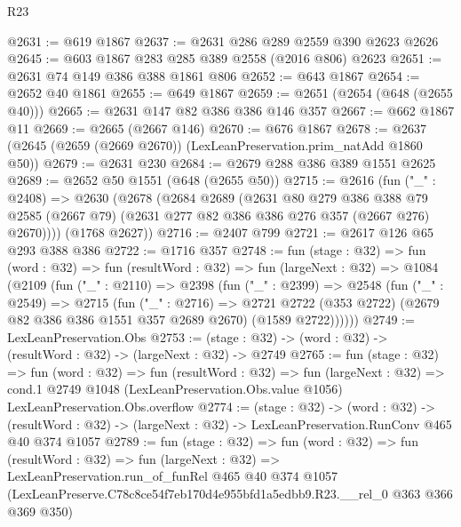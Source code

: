 \begin{lexlean}{R23}
\begin{coremodule}
@2631 := @619 @1867
@2637 := @2631 @286 @289 @2559 @390 @2623 @2626
@2645 := @603 @1867 @283 @285 @389 @2558 (@2016 @806) @2623
@2651 := @2631 @74 @149 @386 @388 @1861 @806
@2652 := @643 @1867
@2654 := @2652 @40 @1861
@2655 := @649 @1867
@2659 := @2651 (@2654 (@648 (@2655 @40)))
@2665 := @2631 @147 @82 @386 @386 @146 @357
@2667 := @662 @1867 @11
@2669 := @2665 (@2667 @146)
@2670 := @676 @1867
@2678 := @2637 (@2645 (@2659 (@2669 @2670)) (LexLeanPreservation.prim_natAdd @1860 @50))
@2679 := @2631 @230
@2684 := @2679 @288 @386 @389 @1551 @2625
@2689 := @2652 @50 @1551 (@648 (@2655 @50))
@2715 := @2616
    (fun ("_" : @2408) =>
    @2630
      (@2678
        (@2684
          @2689
          (@2631
            @80
            @279
            @386
            @388
            @79
            @2585
            (@2667 @79)
            (@2631 @277 @82 @386 @386 @276 @357 (@2667 @276) @2670))))
      (@1768 @2627))
@2716 := @2407 @799
@2721 := @2617 @126 @65 @293 @388 @386
@2722 := @1716 @357
@2748 := fun (stage : @32) =>
  fun (word : @32) =>
  fun (resultWord : @32) =>
  fun (largeNext : @32) =>
  @1084
    (@2109
      (fun ("_" : @2110) =>
      @2398
        (fun ("_" : @2399) =>
        @2548
          (fun ("_" : @2549) =>
          @2715
            (fun ("_" : @2716) =>
            @2721 @2722 (@353 @2722) (@2679 @82 @386 @386 @1551 @357 @2689 @2670) (@1589 @2722))))))
@2749 := LexLeanPreservation.Obs
@2753 := (stage : @32) -> (word : @32) -> (resultWord : @32) -> (largeNext : @32) -> @2749
@2765 := fun (stage : @32) =>
  fun (word : @32) =>
  fun (resultWord : @32) =>
  fun (largeNext : @32) =>
  cond.{1} @2749 @1048 (LexLeanPreservation.Obs.value @1056) LexLeanPreservation.Obs.overflow
@2774 := (stage : @32) ->
  (word : @32) ->
  (resultWord : @32) -> (largeNext : @32) -> LexLeanPreservation.RunConv @465 @40 @374 @1057
@2789 := fun (stage : @32) =>
  fun (word : @32) =>
  fun (resultWord : @32) =>
  fun (largeNext : @32) =>
  LexLeanPreservation.run_of_funRel
    @465
    @40
    @374
    @1057
    (LexLeanPreserve.C78c8ce54f7eb170d4e955bfd1a5edbb9.R23.__rel_0 @363 @366 @369 @350)
\end{coremodule}
\end{lexlean}
